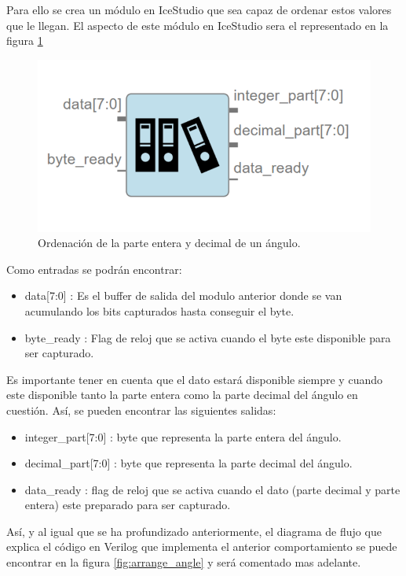 Para ello se crea un módulo en IceStudio que sea capaz de ordenar estos valores que le llegan. El aspecto de este módulo en IceStudio sera el representado en la figura \ref{fig:arrange_arduino}

\begin{figure}[H]
	\center
	\includegraphics[scale=0.5]{imagenes/Balancing_robot/arrange_arduino.PNG}
	\caption{Ordenación de la parte entera y decimal de un ángulo.}
	\label{fig:arrange_arduino}
\end{figure}

Como entradas se podrán encontrar:

\begin{itemize}
	\item data[7:0] : Es el buffer de salida del modulo anterior donde se van acumulando los bits capturados hasta conseguir el byte.
	\item byte\_ready : Flag de reloj que se activa cuando el byte este disponible para ser capturado.
\end{itemize}

Es importante tener en cuenta que el dato estará disponible siempre y cuando este disponible tanto la parte entera como la parte decimal del ángulo en cuestión. Así, se pueden encontrar las siguientes salidas:

\begin{itemize}
	\item integer\_part[7:0] : byte que representa la parte entera del ángulo.
	\item decimal\_part[7:0] : byte que representa la parte decimal del ángulo.
	\item data\_ready : flag de reloj que se activa cuando el dato (parte decimal y parte entera) este preparado para ser capturado.	
\end{itemize}

Así, y al igual que se ha profundizado anteriormente, el diagrama de flujo que explica el código en Verilog que implementa el anterior comportamiento se puede encontrar en la figura \ref{fig:arrange_angle} y será comentado mas adelante.

